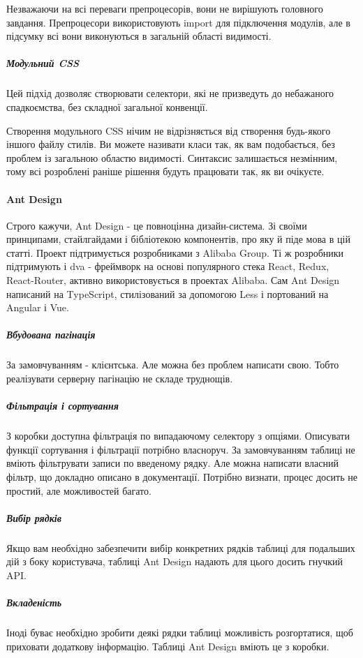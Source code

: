 Незважаючи на всі переваги препроцесорів, вони не вирішують головного завдання. Препроцесори використовують import для підключення модулів, але в підсумку всі вони виконуються в загальній області видимості.

\subparagraph{Модульний CSS}

Цей підхід дозволяє створювати селектори, які не призведуть до небажаного спадкоємства, без складної загальної конвенції.

Створення модульного CSS нічим не відрізняється від створення будь-якого іншого файлу стилів. Ви можете називати класи так, як вам подобається, без проблем із загальною областю видимості. Синтаксис залишається незмінним, тому всі розроблені раніше рішення будуть працювати так, як ви очікуєте.

\paragraph{Ant Design}

Строго кажучи, Ant Design - це повноцінна дизайн-система. Зі своїми принципами, стайлгайдами і бібліотекою компонентів, про яку й піде мова в цій статті. Проект підтримується розробниками з Alibaba Group. Ті ж розробники підтримують і dva - фреймворк на основі популярного стека React, Redux, React-Router, активно використовується в проектах Alibaba. Сам Ant Design написаний на TypeScript, стилізований за допомогою Less і портований на Angular і Vue.

\subparagraph{Вбудована пагінація}
За замовчуванням - клієнтська. Але можна без проблем написати свою. Тобто реалізувати серверну пагінацію не складе труднощів.

\subparagraph{Фільтрація і сортування}
З коробки доступна фільтрація по випадаючому селектору з опціями. Описувати функції сортування і фільтрації потрібно власноруч. За замовчуванням таблиці не вміють фільтрувати записи по введеному рядку. Але можна написати власний фільтр, що докладно описано в документації. Потрібно визнати, процес досить не простий, але можливостей багато.

\subparagraph{Вибір рядків}
Якщо вам необхідно забезпечити вибір конкретних рядків таблиці для подальших дій з боку користувача, таблиці Ant Design надають для цього досить гнучкий API.

\subparagraph{Вкладеність}
Іноді буває необхідно зробити деякі рядки таблиці можливість розгортатися, щоб приховати додаткову інформацію. Таблиці Ant Design вміють це з коробки.

